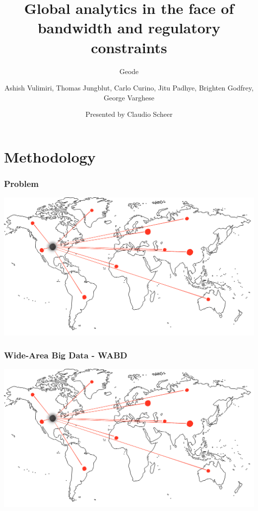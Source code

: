 \documentclass{beamer}
\title[Geode]
{Global analytics in the face of bandwidth and regulatory constraints}
\subtitle{Geode}
\author[Vulimiri et al., 2015]
{Ashish Vulimiri, Thomas Jungblut, Carlo Curino, Jitu Padhye, Brighten Godfrey, George Varghese}
\date[Big Data Infrastructure]
{Presented by Claudio Scheer}
\begin{document}
\frame{\titlepage}


\section{Methodology}
\begin{frame}
	\frametitle{Problem}
	\includegraphics[width=\textwidth]{./images/world-map.png}
\end{frame}

\begin{frame}
	\frametitle{Wide-Area Big Data - WABD}
	\includegraphics[width=\textwidth]{./images/world-map.png}
\end{frame}
\end{document}
